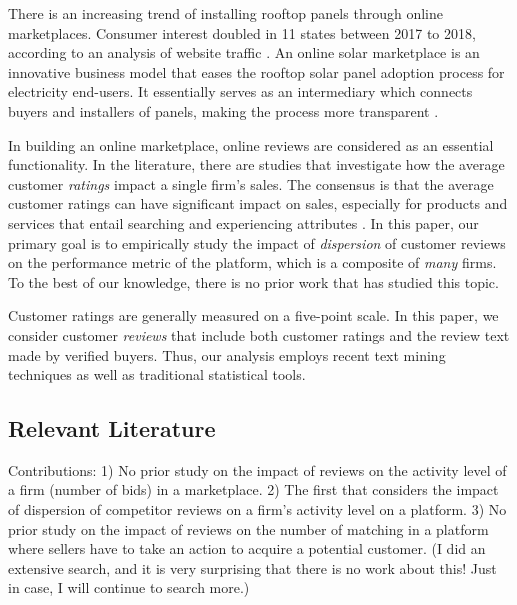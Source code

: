 \documentclass[msom,blindrev]{informs3}
\begin{document}
There is an increasing trend of installing rooftop panels through online marketplaces. Consumer interest doubled in 11 states between 2017 to 2018, according to an analysis of website traffic \citep{energysageintel19}.
An online solar marketplace is an innovative business model that eases the rooftop solar panel adoption process for electricity end-users. It essentially serves as an intermediary which connects buyers and installers of panels, making the process more transparent \citep{dorsey2019access}.

In building an online marketplace, online reviews are considered as an essential functionality. In the literature, there are studies that investigate how the average customer \emph{ratings} impact a single firm's sales. The consensus is that the average customer ratings can have significant impact on sales, especially for products and services that entail searching and experiencing attributes \citep{zimmermann2018decomposing}. In this paper, our primary goal is to empirically study the impact of \emph{dispersion} of customer reviews on the performance metric of the platform, which is a composite of \emph{many} firms. To the best of our knowledge, there is no prior work that has studied this topic.

Customer ratings are generally measured on a five-point scale. In this paper, we consider customer \emph{reviews} that include both customer ratings and the review text made by verified buyers. Thus, our analysis employs recent text mining techniques as well as traditional statistical tools.

\subsection{Relevant Literature}

Contributions:
1) No prior study on the impact of reviews on the activity level of a firm (number of bids) in a marketplace.
2) The first that considers the impact of dispersion of competitor reviews on a firm’s activity level on a platform.
3) No prior study on the impact of reviews on the number of matching in a platform where sellers have to take an action to acquire a potential customer. (I did an extensive search, and it is very surprising that there is no work about this! Just in case, I will continue to search more.)
\end{document}
